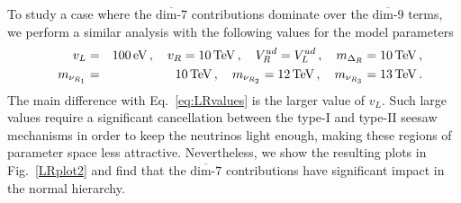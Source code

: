 \documentclass[letterpaper,11pt]{article}
\newcommand{\Dt}{\Delta}
\newcommand{\bea}{\begin{eqnarray}}
\newcommand{\eea}{\end{eqnarray}}
\newcommand{\nn}{\nonumber}
\newcommand{\textoverline}[1]{$\overline{\mbox{#1}}$}
\begin{document}
To study a case where the \textoverline{dim-7} contributions dominate over the \textoverline{dim-9} terms, we perform a similar analysis with the following values for the model parameters
\bea\label{eq:LRvalues2}
 \quad v_L&=&100 \, {\rm eV}\,, \quad v_R=10\, {\rm TeV}\, ,\quad V_R^{ud}=V_L^{ud}\,,\quad m_{\Dt_R} = 10\, {\rm TeV}\,,\nn\\
\quad m_{\nu_{R_1}}&=&10\,{\rm TeV}\, ,\quad m_{\nu_{R_2}}=12\,{\rm TeV}\, ,\quad m_{\nu_{R_3}}=13\,{\rm TeV}\, .
\eea
The main difference with Eq.~\eqref{eq:LRvalues} is the larger value of $v_L$. Such large values require a significant cancellation between the type-I and type-II seesaw mechanisms in order to keep the neutrinos light enough, making these regions of parameter space  less attractive. Nevertheless, we show the resulting plots in Fig.\ \ref{LRplot2} and find that the \textoverline{dim-7} contributions have significant impact in the normal hierarchy. 
\end{document}
